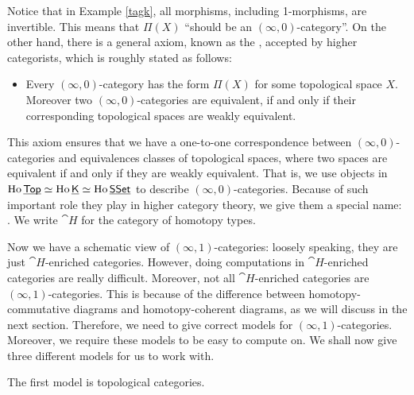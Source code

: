 Notice that in Example \ref{tagk}, all morphisms, including 1-morphisms, are invertible. This means that $\Pi(X)$ ``should be
an $(\infty,0)$-category''. On the other hand, there is a general axiom, known as the ,
accepted by higher categorists, which is roughly stated as follows:

\begin{itemize}
    \item Every $(\infty,0)$-category has the form $\Pi(X)$ for some topological space $X$. Moreover two $(\infty,0)$-categories 
    are equivalent, if and only if their corresponding topological spaces are weakly equivalent.
\end{itemize}

This axiom ensures that we have a one-to-one correspondence between $(\infty,0)$-categories and equivalences classes of topological spaces,
where two spaces are equivalent if and only if they are weakly equivalent. That is, we use objects 
in $\operatorname{Ho}\underline{\smash{\mathsf{Top}}}\simeq\operatorname{Ho}\underline{\smash{\mathsf{K}}}\simeq\operatorname{Ho}\underline{\smash{\mathsf{SSet}}}$ to describe $(\infty,0)$-categories. Because of such important role they play in
higher category theory, we give them a special name: . We write $\cat{H}$ for the category of homotopy types.

Now we have a schematic view of $(\infty,1)$-categories: loosely speaking, they are just $\cat{H}$-enriched categories.
However, doing computations in $\cat{H}$-enriched categories are really difficult. Moreover, not all $\cat{H}$-enriched categories
are $(\infty,1)$-categories. This is because of the difference between homotopy-commutative diagrams and homotopy-coherent diagrams,
as we will discuss in the next section. Therefore, we need to give correct models for $(\infty,1)$-categories. 
Moreover, we require these models to be easy to compute on. We shall now give three different models for us to work with.


The first model is topological categories. 


